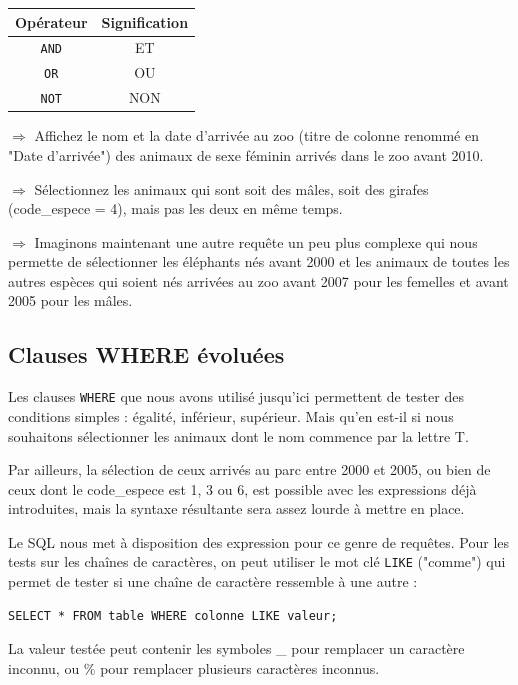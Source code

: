 \documentclass[11pt]{article}
\newcommand{\action}{$\Rightarrow$ }
\begin{document}
\begin{center}
	\begin{tabular}{c|c}
		\textbf{Opérateur} & \textbf{Signification} \\
		\hline
		\lstinline{AND} & ET \\
		\lstinline{OR} & OU \\
		\lstinline{NOT} & NON \\
	\end{tabular}
\end{center}

\action Affichez le nom et la date d'arrivée au zoo (titre de colonne renommé en "Date d'arrivée") des animaux de sexe féminin arrivés dans le zoo avant 2010.

\action Sélectionnez les animaux qui sont soit des mâles, soit des girafes (code\_espece = 4), mais pas les deux en même temps.

\action Imaginons maintenant une autre requête un peu plus complexe qui nous permette de sélectionner les éléphants nés avant 2000 et les animaux de toutes les autres espèces qui soient nés arrivées au zoo avant 2007 pour les femelles et avant 2005 pour les mâles.

\subsection{Clauses WHERE évoluées}
Les clauses \lstinline{WHERE} que nous avons utilisé jusqu'ici permettent de tester des conditions simples : égalité, inférieur, supérieur. Mais qu'en est-il si nous souhaitons sélectionner les animaux dont le nom commence par la lettre T. 

				Par ailleurs, la sélection de ceux arrivés au parc entre 2000 et 2005, ou bien de ceux dont le code\_espece est 1, 3 ou 6, est possible avec les expressions déjà introduites, mais la syntaxe résultante sera assez lourde à mettre en place.

Le SQL nous met à disposition des expression pour ce genre de requêtes. Pour les tests sur les chaînes de caractères, on peut utiliser le mot clé \lstinline{LIKE} ("comme") qui permet de tester si une chaîne de caractère ressemble à une autre :
\begin{lstlisting}
SELECT * FROM table WHERE colonne LIKE valeur;				
\end{lstlisting}

La valeur testée peut contenir les symboles \_ pour remplacer un caractère inconnu, ou \% pour remplacer plusieurs caractères inconnus.
\end{document}
